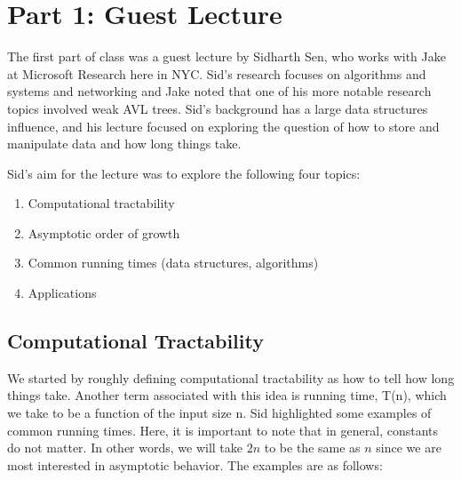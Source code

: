 
\section{Part 1: Guest Lecture}
The first part of class was a guest lecture by Sidharth Sen, who works with Jake at Microsoft Research here in NYC. Sid's research focuses on algorithms and systems and networking and Jake noted that one of his more notable research topics involved weak AVL trees. Sid's background has a large data structures influence, and his lecture focused on exploring the question of how to store and manipulate data and how long things take.

\vspace{3mm}
Sid's aim for the lecture was to explore the following four topics:
\begin{enumerate}
    \item Computational tractability
    \item Asymptotic order of growth
    \item Common running times (data structures, algorithms)
    \item Applications
\end{enumerate}

\subsection{Computational Tractability}

We started by roughly defining computational tractability as how to tell how long things take. Another term associated with this idea is running time, T(n), which we take to be a function of the input size n. Sid highlighted some examples of common running times. Here, it is important to note that in general, constants do not matter. In other words, we will take $2n$ to be the same as $n$ since we are most interested in asymptotic behavior. The examples are as follows:

